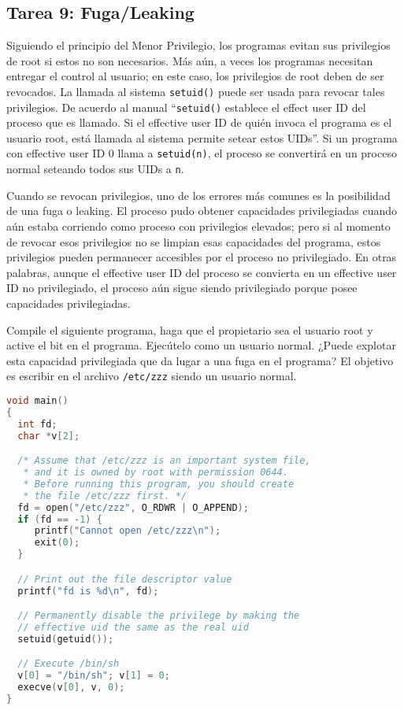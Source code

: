 \subsection{Tarea 9: Fuga/Leaking}

Siguiendo el principio del Menor Privilegio, los programas \setuid evitan sus privilegios de root si estos no son necesarios. Más aún, a veces los programas necesitan entregar el control al usuario; en este caso, los privilegios de root deben de ser revocados. 
La llamada al sistema {\tt setuid()}  puede ser usada para revocar tales privilegios. 
De acuerdo al manual ``\texttt{setuid()} establece el effect user ID del proceso que es llamado. Si el effective user ID de quién invoca el programa es el usuario root, está llamada al sistema permite setear estos UIDs''.
Si un programa \setuid con effective user ID 0 llama a \texttt{setuid(n)}, el proceso se convertirá en un proceso normal seteando todos sus UIDs a \texttt{n}.

Cuando se revocan privilegios, uno de los errores más comunes es la posibilidad de una fuga o leaking. El proceso pudo obtener capacidades privilegiadas cuando aún estaba corriendo como proceso con privilegios elevados; pero si al momento de revocar esos privilegios no se limpian esas capacidades del programa, estos privilegios pueden permanecer accesibles por el proceso no privilegiado. En otras palabras, aunque el effective user ID del proceso se convierta en un effective user ID no privilegiado, el proceso aún sigue siendo privilegiado porque posee capacidades privilegiadas.

Compile el siguiente programa, haga que el propietario sea el usuario root y active el bit \setuid en el programa. Ejecútelo como un usuario normal.
¿Puede explotar esta capacidad privilegiada que da lugar a una fuga en el programa?
El objetivo es escribir en el archivo {\tt /etc/zzz} siendo un usuario normal.

\begin{lstlisting}[language=C, caption=\texttt{cap\_leak.c}]
void main()
{
  int fd;
  char *v[2];

  /* Assume that /etc/zzz is an important system file,
   * and it is owned by root with permission 0644.
   * Before running this program, you should create
   * the file /etc/zzz first. */
  fd = open("/etc/zzz", O_RDWR | O_APPEND);
  if (fd == -1) {
     printf("Cannot open /etc/zzz\n");
     exit(0);
  }

  // Print out the file descriptor value
  printf("fd is %d\n", fd);

  // Permanently disable the privilege by making the
  // effective uid the same as the real uid
  setuid(getuid());

  // Execute /bin/sh
  v[0] = "/bin/sh"; v[1] = 0;
  execve(v[0], v, 0);
}
\end{lstlisting}



